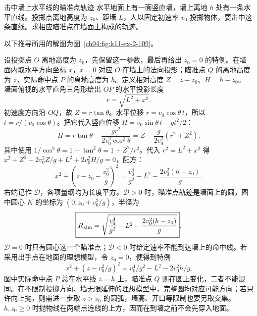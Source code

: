 {\begin{origexamplebox}{击中墙上水平线的瞄准点轨迹}\label{ch04:ex:k11-2-109}
水平地面上有一面竖直墙，墙上离地 $h$ 处有一条水平直线。投掷点离地高度为 $z_0$、距墙 $L$，人以固定初速率 $v_0$ 投掷物体，要击中这条直线。求相应瞄准点在墙面上构成的轨迹。

\begin{qualityfigure}
\label{mech:04:109:q}
\end{qualityfigure}
\end{origexamplebox}
\begin{xesolution}
以下推导所用的解图为图~\ref{ch04:fig:k11-ex-2-109}。

设投掷点 $O$ 离地高度为 $z_0$，先保留这一参数，最后再给出 $z_0=0$ 的特例。在墙面内取水平方向坐标 $x$，$x=0$ 对应 $O$ 在墙上的法向投影；瞄准点 $Q$ 的离地高度为 $z$，实际命中点 $P$ 的离地高度为 $h$。定义相对高度 $Z=z-z_0$、$H=h-z_0$。
\AimLocusDiagram
墙面俯视的水平直角三角形给出 $OP$ 的水平投影长度
\[
r=\sqrt{L^2+x^2}.
\]
初速度方向沿 $OQ$，故 $Z=r\tan\theta$。水平位移 $r=v_0\cos\theta\,t$，所以 $t=r/(v_0\cos\theta)$。把它代入竖直位移 $H=v_0\sin\theta\,t-gt^2/2$：
\[
H=r\tan\theta-\frac{gr^2}{2v_0^2\cos^2\theta}
=Z-\frac{g}{2v_0^2}(r^2+Z^2).
\]
其中使用 $1/\cos^2\theta=1+\tan^2\theta=1+Z^2/r^2$。代入 $r^2=L^2+x^2$ 得 $x^2+Z^2-2v_0^2Z/g+L^2+2v_0^2H/g=0$，配方：
\[
\boxed{x^2+\left(z-z_0-\frac{v_0^2}{g}\right)^2
=\frac{v_0^4}{g^2}-L^2-\frac{2v_0^2(h-z_0)}{g}}.
\]
右端记作 $\mathcal D$，各项量纲均为长度平方。$\mathcal D>0$ 时，瞄准点轨迹是墙面上的圆，图中圆心 $K$ 的坐标为 $(0,z_0+v_0^2/g)$，半径为
\[
\boxed{R_{\rm aim}=\sqrt{\frac{v_0^4}{g^2}-L^2-\frac{2v_0^2(h-z_0)}{g}}}.
\]
$\mathcal D=0$ 时只有圆心这一个瞄准点；$\mathcal D<0$ 时给定速率不能到达墙上的命中线。若采用出手点在地面的理想模型，令 $z_0=0$，便得到特例
\[
x^2+(z-v_0^2/g)^2=v_0^4/g^2-L^2-2v_0^2h/g.
\]
图中实际命中点 $P$ 总在水平线 $z=h$ 上，瞄准点 $Q$ 则在圆上变化，二者不能混同。在不限制投掷方向、墙无限延伸的理想模型中，完整圆均对应可能方向；若只许向上抛，则需进一步取 $z>z_0$ 的圆弧，墙高、开口等限制也要另取交集。$h,z_0\ge0$ 时抛物线在两端点连线的上方，因而在到墙之前不会先穿入地面。
\end{xesolution}
}

\endgroup
